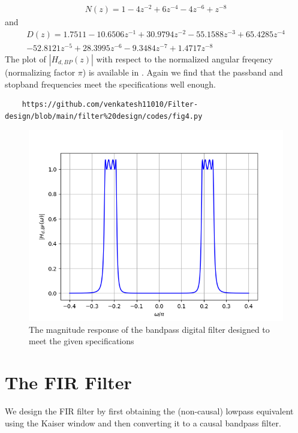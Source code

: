 \documentclass{article}
\begin{document}
\begin{eqnarray}
N(z)=  1 - 4 z^{-2} + 6 z^{-4} - 4z^{-6} + z^{-8} 
\end{eqnarray}
and
\begin{eqnarray}
D(z) = 1.7511 -10.6506z^{-1} + 30.9794z^{-2}  -55.1588z^{-3}+  65.4285z^{-4}\nonumber \\
  -52.8121z^{-5}+   28.3995z^{-6}  -9.3484z^{-7} +   1.4717z^{-8}
\end{eqnarray}
The plot of $|H_{d,BP}(z)|$ with respect to the normalized angular freqency (normalizing factor $\pi$) is available in .  Again we
find that the passband and stopband frequencies meet the specifications well enough.
\begin{lstlisting}
	https://github.com/venkatesh11010/Filter-design/blob/main/filter%20design/codes/fig4.py
\end{lstlisting}
\begin{figure}[H]
\includegraphics[width = \columnwidth]{figs/fig4.png}
\caption{The magnitude response of the bandpass digital filter designed to meet the given specifications} 
\label{fig5}
\end{figure}

\section{The FIR Filter}
We design the FIR filter by first obtaining the (non-causal) lowpass equivalent using the Kaiser window
and then
converting it to a causal bandpass filter.
\end{document}
